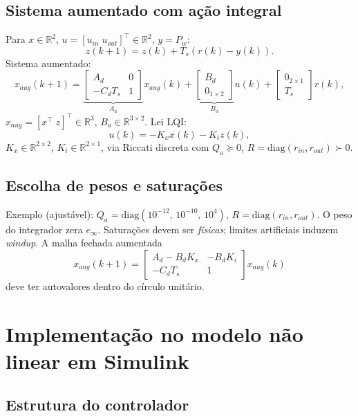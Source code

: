 \subsection{Sistema aumentado com ação integral}
\label{sec:lqi-mimo}

Para $x\in\mathbb{R}^2$, $u=[u_{in}\;u_{out}]^\top\in\mathbb{R}^2$, $y=P_w$:
\[
z(k+1)=z(k)+T_s(r(k)-y(k)).
\]
Sistema aumentado:
\[
x_{aug}(k+1)=
\underbrace{\begin{bmatrix}A_d&0\\-C_d T_s&1\end{bmatrix}}_{A_a}\!
x_{aug}(k)+
\underbrace{\begin{bmatrix}B_d\\ 0_{1\times 2}\end{bmatrix}}_{B_a}\!u(k)+
\begin{bmatrix}0_{2\times 1}\\ T_s\end{bmatrix}r(k),
\]
$x_{aug}=[x^\top\; z]^\top\in\mathbb{R}^3$, $B_a\in\mathbb{R}^{3\times 2}$. Lei LQI:
\[
u(k)=-K_x x(k)-K_i z(k),
\]
$K_x\in\mathbb{R}^{2\times 2}$, $K_i\in\mathbb{R}^{2\times 1}$, via Riccati discreta com $Q_a\succeq 0$, $R=\mathrm{diag}(r_{in},r_{out})\succ 0$.

\subsection{Escolha de pesos e saturações}

Exemplo (ajustável): $Q_a=\mathrm{diag}(10^{-12},\,10^{-10},\,10^{4})$, $R=\mathrm{diag}(r_{in},r_{out})$. O peso do integrador zera $e_\infty$. Saturações devem ser \emph{físicas}; limites artificiais induzem \emph{windup}. A malha fechada aumentada
\[
x_{aug}(k+1)=
\begin{bmatrix}A_d - B_d K_x & - B_d K_i \\ - C_d T_s & 1\end{bmatrix}
x_{aug}(k)
\]
deve ter autovalores dentro do círculo unitário.

\section{Implementação no modelo não linear em Simulink}
\label{sec:implementacao-simulink}

\subsection{Estrutura do controlador}
\label{sec:estrutura-controlador-simulink}

